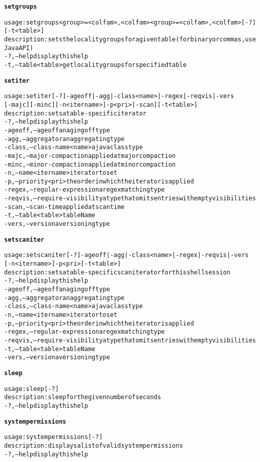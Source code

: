 \begin{alltt}
\textbf{setgroups}

    usage: setgroups <group>=<col fam>{,<col fam>}{ <group>=<col fam>{,<col fam>}} [-?]
              [-t <table>]
    description: sets the locality groups for a given table (for binary or commas, use
              Java API)
      -?,--help  display this help
      -t,--table <table>  get locality groups for specified table

\textbf{setiter}

    usage: setiter [-?] -ageoff | -agg | -class <name> | -regex | -reqvis | -vers 
              [-majc] [-minc] [-n <itername>] -p <pri>  [-scan] [-t <table>]
    description: sets a table-specific iterator
      -?,--help  display this help
      -ageoff,--ageoff  an aging off type
      -agg,--aggregator  an aggregating type
      -class,--class-name <name>  a java class type
      -majc,--major-compaction  applied at major compaction
      -minc,--minor-compaction  applied at minor compaction
      -n,--name <itername>  iterator to set
      -p,--priority <pri>  the order in which the iterator is applied
      -regex,--regular-expression  a regex matching type
      -reqvis,--require-visibility  a type that omits entries with empty visibilities
      -scan,--scan-time  applied at scan time
      -t,--table <table>  tableName
      -vers,--version  a versioning type

\textbf{setscaniter}

    usage: setscaniter [-?] -ageoff | -agg | -class <name> | -regex | -reqvis | -vers 
              [-n <itername>] -p <pri>  [-t <table>]
    description: sets a table-specific scan iterator for this shell session
      -?,--help  display this help
      -ageoff,--ageoff  an aging off type
      -agg,--aggregator  an aggregating type
      -class,--class-name <name>  a java class type
      -n,--name <itername>  iterator to set
      -p,--priority <pri>  the order in which the iterator is applied
      -regex,--regular-expression  a regex matching type
      -reqvis,--require-visibility  a type that omits entries with empty visibilities
      -t,--table <table>  tableName
      -vers,--version  a versioning type

\textbf{sleep}

    usage: sleep [-?]
    description: sleep for the given number of seconds
      -?,--help  display this help

\textbf{systempermissions}

    usage: systempermissions [-?]
    description: displays a list of valid system permissions
      -?,--help  display this help


\end{alltt}
